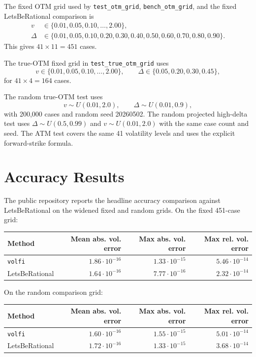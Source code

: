\documentclass[11pt]{article}
\begin{document}
	The fixed OTM grid used by \texttt{test\_otm\_grid}, \texttt{bench\_otm\_grid}, and the fixed LetsBeRational comparison is
	\begin{equation}
		\begin{aligned}
			v &\in \{0.01,0.05,0.10,\ldots,2.00\},\\
			\Delta &\in \{0.01,0.05,0.10,0.20,0.30,0.40,0.50,0.60,0.70,0.80,0.90\}.
		\end{aligned}
	\end{equation}
	This gives $41\times 11=451$ cases.
	
	The true-OTM fixed grid in \texttt{test\_true\_otm\_grid} uses
	\begin{equation}
		v \in \{0.01,0.05,0.10,\ldots,2.00\}, \qquad
		\Delta \in \{0.05,0.20,0.30,0.45\},
	\end{equation}
	for $41\times4=164$ cases.
	
	The random true-OTM test uses
	\begin{equation}
		v\sim U(0.01,2.0), \qquad \Delta\sim U(0.01,0.9),
	\end{equation}
	with 200,000 cases and random seed 20260502. The random projected high-delta test uses $\Delta\sim U(0.5,0.99)$ and $v\sim U(0.01,2.0)$ with the same case count and seed. The ATM test covers the same 41 volatility levels and uses the explicit forward-strike formula.
	
	\section{Accuracy Results}
	
	The public repository reports the headline accuracy comparison against LetsBeRational on the widened fixed and random grids. On the fixed 451-case grid:
	\begin{center}
		\begin{tabular}{lrrr}
			\toprule
			Method & Mean abs. vol. error & Max abs. vol. error & Max rel. vol. error \\
			\midrule
			\texttt{volfi} & $1.86\cdot 10^{-16}$ & $1.33\cdot 10^{-15}$ & $5.46\cdot 10^{-14}$ \\
			LetsBeRational & $1.64\cdot 10^{-16}$ & $7.77\cdot 10^{-16}$ & $2.32\cdot 10^{-14}$ \\
			\bottomrule
		\end{tabular}
	\end{center}
	
	On the random comparison grid:
	\begin{center}
		\begin{tabular}{lrrr}
			\toprule
			Method & Mean abs. vol. error & Max abs. vol. error & Max rel. vol. error \\
			\midrule
			\texttt{volfi} & $1.60\cdot 10^{-16}$ & $1.55\cdot 10^{-15}$ & $5.01\cdot 10^{-14}$ \\
			LetsBeRational & $1.72\cdot 10^{-16}$ & $1.33\cdot 10^{-15}$ & $3.68\cdot 10^{-14}$ \\
			\bottomrule
		\end{tabular}
	\end{center}
	
\end{document}
